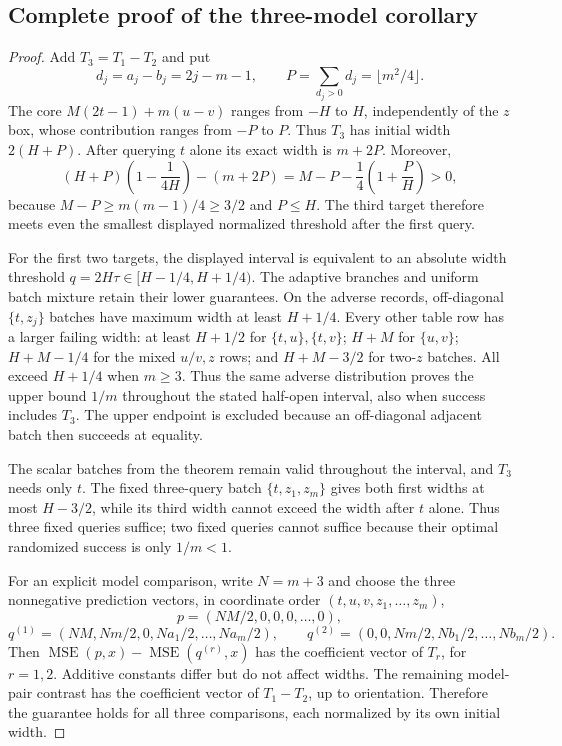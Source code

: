 \subsection{Complete proof of the three-model corollary}
\begin{proof}
Add $T_3=T_1-T_2$ and put
\[
 d_j=a_j-b_j=2j-m-1,\qquad
 P=\sum_{d_j>0}d_j=\lfloor m^2/4\rfloor.
\]
The core $M(2t-1)+m(u-v)$ ranges from $-H$ to $H$, independently of
the $z$ box, whose contribution ranges from $-P$ to $P$. Thus $T_3$ has
initial width $2(H+P)$. After querying $t$ alone its exact width is
$m+2P$. Moreover,
\[
 (H+P)\left(1-\frac1{4H}\right)-(m+2P)
 =M-P-\frac14\left(1+\frac PH\right)>0,
\]
because $M-P\geq m(m-1)/4\geq3/2$ and $P\leq H$.
The third target therefore meets even the smallest displayed normalized
threshold after the first query.

For the first two targets, the displayed interval is equivalent to an
absolute width threshold $q=2H\tau\in[H-1/4,H+1/4)$. The adaptive
branches and uniform batch mixture retain their lower guarantees.
On the adverse records, off-diagonal $\{t,z_j\}$ batches have maximum
width at least $H+1/4$. Every other table row has a larger failing width:
at least $H+1/2$ for $\{t,u\},\{t,v\}$;
$H+M$ for $\{u,v\}$; $H+M-1/4$ for the mixed $u/v,z$ rows;
and $H+M-3/2$ for two-$z$ batches. All exceed $H+1/4$ when $m\geq3$.
Thus the same adverse distribution proves the upper bound $1/m$
throughout the stated half-open interval, also when success includes $T_3$.
The upper endpoint is excluded because an off-diagonal adjacent batch
then succeeds at equality.

The scalar batches from the theorem remain valid throughout the interval,
and $T_3$ needs only $t$. The fixed three-query batch $\{t,z_1,z_m\}$
gives both first widths at most $H-3/2$, while its third width cannot
exceed the width after $t$ alone. Thus three fixed queries suffice;
two fixed queries cannot suffice because their optimal randomized success
is only $1/m<1$.

For an explicit model comparison, write $N=m+3$ and choose the three
nonnegative prediction vectors, in coordinate order $(t,u,v,z_1,\ldots,z_m)$,
\[
 p=(NM/2,0,0,0,\ldots,0),
\]
\[
 q^{(1)}=(NM,Nm/2,0,Na_1/2,\ldots,Na_m/2),\qquad
 q^{(2)}=(0,0,Nm/2,Nb_1/2,\ldots,Nb_m/2).
\]
Then $\operatorname{MSE}(p,x)-\operatorname{MSE}(q^{(r)},x)$ has
the coefficient vector of $T_r$, for $r=1,2$. Additive constants differ
but do not affect widths. The remaining model-pair contrast has the
coefficient vector of $T_1-T_2$, up to orientation. Therefore the guarantee
holds for all three comparisons, each normalized by its own initial width.
\end{proof}

